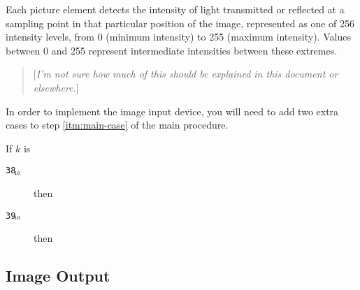 \documentclass[a4paper,12pt]{article}
\newcommand{\num}[1]{\texttt{#1}\xspace}
\newcommand{\hex}[1]{\num{#1}$_{\textup{\tiny\hskip-1ex 16}}$\xspace}
\newcommand{\SP}{\textbf{stack pointer}\xspace}
\newcommand{\comment}[1]{\begin{quote}[\textit{#1}]\end{quote}}
\newcommand{\op}[1]{#1}
\newcommand{\READFRAME} [1]{\op{\hex{38}}}
\newcommand{\READPIXEL} [1]{\op{\hex{39}}}
\begin{document}
Each picture element detects the intensity of light transmitted or reflected at a sampling point in that particular position of the image, represented as one of 256 intensity levels, from 0 (minimum intensity) to 255 (maximum intensity).
Values between 0 and 255 represent intermediate intensities between these extremes.

\comment{I'm not sure how much of this should be explained in this document or elsewhere.}

In order to implement the image input device, you will need to add two extra cases to step \ref{itm:main-case} of the main procedure.

\begin{stepnumbers}[start=3]
\item If $k$ is
  \begin{description}
  \item[\READFRAME{}] then
  \item[\READPIXEL{}] then
  \end{description}
\end{stepnumbers}

\subsection{Image Output}
\end{document}
